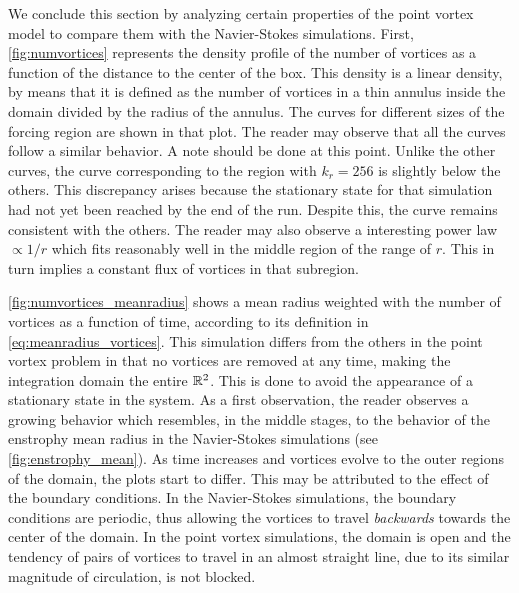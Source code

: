 \documentclass[../main.tex]{subfiles}
\begin{document}
We conclude this section by analyzing certain properties of the point vortex model to compare them with the Navier-Stokes simulations. First, \cref{fig:numvortices} represents the density profile of the number of vortices as a function of the distance to the center of the box. This density is a linear density, by means that it is defined as the number of vortices in a thin annulus inside the domain divided by the radius of the annulus. The curves for different sizes of the forcing region are shown in that plot. The reader may observe that all the curves follow a similar behavior. A note should be done at this point. Unlike the other curves, the curve corresponding to the region with $k_r=256$ is slightly below the others. This discrepancy arises because the stationary state for that simulation had not yet been reached by the end of the run. Despite this, the curve remains consistent with the others. The reader may also observe a interesting power law $\propto 1/r$ which fits reasonably well in the middle region of the range of $r$. This in turn implies a constant flux of vortices in that subregion.

\cref{fig:numvortices_meanradius} shows a mean radius weighted with the number of vortices as a function of time, according to its definition in \cref{eq:meanradius_vortices}. This simulation differs from the others in the point vortex problem in that no vortices are removed at any time, making the integration domain the entire $\mathbb{R}^2$. This is done to avoid the appearance of a stationary state in the system. As a first observation, the reader observes a growing behavior which resembles, in the middle stages, to the behavior of the enstrophy mean radius in the Navier-Stokes simulations (see \cref{fig:enstrophy_mean}). As time increases and vortices evolve to the outer regions of the domain, the plots start to differ. This may be attributed to the effect of the boundary conditions. In the Navier-Stokes simulations, the boundary conditions are periodic, thus allowing the vortices to travel \emph{backwards} towards the center of the domain. In the point vortex simulations, the domain is open and the tendency of pairs of vortices to travel in an almost straight line, due to its similar magnitude of circulation, is not blocked.
\end{document}
